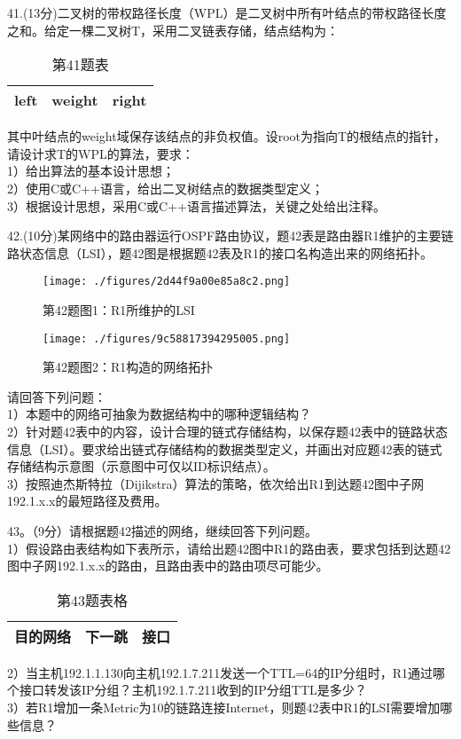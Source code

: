 41.(13分)二叉树的带权路径长度（WPL）是二叉树中所有叶结点的带权路径长度之和。给定一棵二叉树T，采用二叉链表存储，结点结构为：
\begin{table}[ht]
\centering
\caption{第41题表}\label{tab_CSN14_1}
\begin{tabular}{|c|c|c|}
\hline
left & weight & right \\
\hline
\end{tabular}
\end{table}
其中叶结点的weight域保存该结点的非负权值。设root为指向T的根结点的指针，请设计求T的WPL的算法，要求： \\
1）给出算法的基本设计思想； \\
2）使用C或C++语言，给出二叉树结点的数据类型定义； \\
3）根据设计思想，采用C或C++语言描述算法，关键之处给出注释。

42.(10分)某网络中的路由器运行OSPF路由协议，题42表是路由器R1维护的主要链路状态信息（LSI），题42图是根据题42表及R1的接口名构造出来的网络拓扑。
\begin{figure}[ht]
\centering
\texttt{[image: ./figures/2d44f9a00e85a8c2.png]}
\caption{第42题图1：R1所维护的LSI} \label{fig_CSN14_4}
\end{figure}

\begin{figure}[ht]
\centering
\texttt{[image: ./figures/9c58817394295005.png]}
\caption{第42题图2：R1构造的网络拓扑} \label{fig_CSN14_5}
\end{figure}
请回答下列问题： \\
1）本题中的网络可抽象为数据结构中的哪种逻辑结构？ \\
2）针对题42表中的内容，设计合理的链式存储结构，以保存题42表中的链路状态信息（LSI）。要求给出链式存储结构的数据类型定义，并画出对应题42表的链式存储结构示意图（示意图中可仅以ID标识结点）。 \\
3）按照迪杰斯特拉（Dijikstra）算法的策略，依次给出R1到达题42图中子网192.1.x.x的最短路径及费用。

43。（9分）请根据题42描述的网络，继续回答下列问题。 \\
1）假设路由表结构如下表所示，请给出题42图中R1的路由表，要求包括到达题42图中子网192.1.x.x的路由，且路由表中的路由项尽可能少。 \\
\begin{table}[ht]
\centering
\caption{第43题表格}\label{tab_CSN14_2}
\begin{tabular}{|c|c|c|}
\hline
目的网络 & 下一跳 & 接口 \\
\hline
\end{tabular}
\end{table}
2）当主机192.1.1.130向主机192.1.7.211发送一个TTL=64的IP分组时，R1通过哪个接口转发该IP分组？主机192.1.7.211收到的IP分组TTL是多少？ \\
3）若R1增加一条Metric为10的链路连接Internet，则题42表中R1的LSI需要增加哪些信息？

